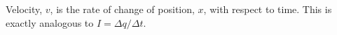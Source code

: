 Velocity, $v$, is the rate of change of position, $x$, with respect to time.
This is exactly analogous to $I=\Delta q/\Delta t$.



